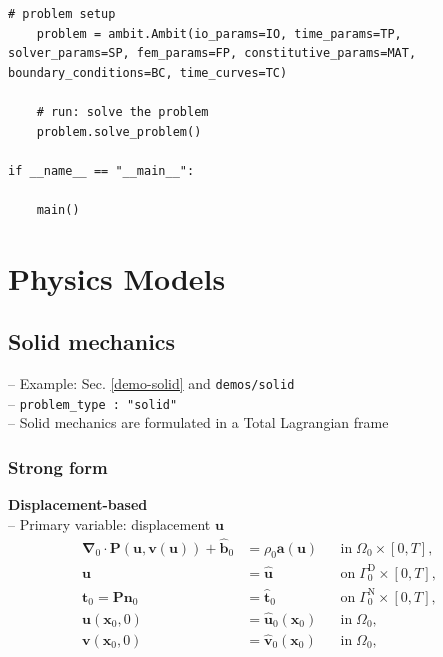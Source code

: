 \documentclass[a4paper,12pt]{report}
\newcommand{\bs}[1]{\boldsymbol{#1}}
\begin{document}
\begin{Verbatim}[breaklines=true]
    # problem setup
    problem = ambit.Ambit(io_params=IO, time_params=TP, solver_params=SP, fem_params=FP, constitutive_params=MAT, boundary_conditions=BC, time_curves=TC)

    # run: solve the problem
    problem.solve_problem()
    
if __name__ == "__main__":

    main()
\end{Verbatim}

\section{Physics Models}\label{physics-models}

\subsection{Solid mechanics}\label{solid-mechanics}

-- Example: Sec. \ref{demo-solid} and \verb"demos/solid"\\

-- \verb.problem_type : "solid".\\

-- Solid mechanics are formulated in a Total Lagrangian frame

\subsubsection{Strong form}

\textbf{Displacement-based}\\

-- Primary variable: displacement $\bs{u}$
\begin{equation}
\label{equation-solid-strong-form}
\begin{aligned}
\bs{\nabla}_{0} \cdot \bs{P}(\bs{u},\bs{v}(\bs{u})) + \hat{\bs{b}}_{0} &= \rho_{0} \bs{a}(\bs{u}) &&\text{in} \; \mathit{\Omega}_{0} \times [0, T], \\
\bs{u} &= \hat{\bs{u}} &&\text{on} \; \mathit{\Gamma}_{0}^{\mathrm{D}} \times [0, T],\\
\bs{t}_{0} = \bs{P}\bs{n}_{0} &= \hat{\bs{t}}_{0} &&\text{on} \; \mathit{\Gamma}_{0}^{\mathrm{N}} \times [0, T],\\
\bs{u}(\bs{x}_{0},0) &= \hat{\bs{u}}_{0}(\bs{x}_{0}) &&\text{in} \; \mathit{\Omega}_{0},\\
\bs{v}(\bs{x}_{0},0) &= \hat{\bs{v}}_{0}(\bs{x}_{0}) &&\text{in} \; \mathit{\Omega}_{0},
\end{aligned}
\end{equation}
\end{document}
